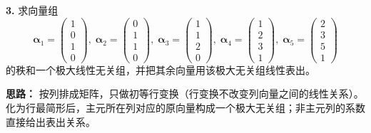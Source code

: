 \else \answerarea[8] \fi%

\textbf{3.} 求向量组
\[
\boldsymbol{\alpha}_1=\begin{pmatrix}1\\0\\1\\0\end{pmatrix},\;
\boldsymbol{\alpha}_2=\begin{pmatrix}0\\1\\1\\0\end{pmatrix},\;
\boldsymbol{\alpha}_3=\begin{pmatrix}1\\1\\2\\0\end{pmatrix},\;
\boldsymbol{\alpha}_4=\begin{pmatrix}1\\2\\3\\1\end{pmatrix},\;
\boldsymbol{\alpha}_5=\begin{pmatrix}2\\3\\5\\1\end{pmatrix}
\]
的秩和一个极大线性无关组，并把其余向量用该极大无关组线性表出。

\ifshowsolutions%
\quad
\textbf{思路：} 按列排成矩阵，只做初等行变换（行变换不改变列向量之间的线性关系）。化为行最简形后，主元所在列对应的原向量构成一个极大无关组；非主元列的系数直接给出表出关系。

